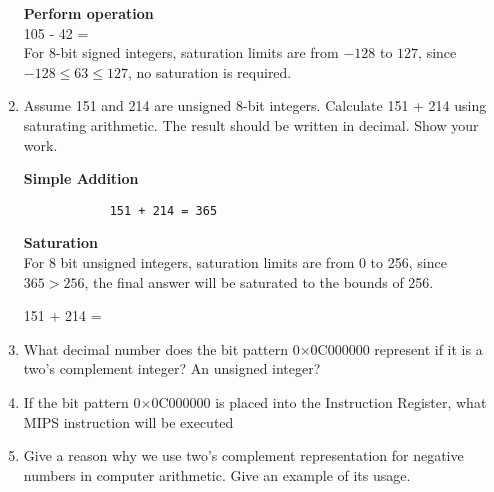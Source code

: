 \documentclass{article}
\begin{document}
\begin{enumerate}
        \textbf{Perform operation}\\[0.25in]
        105 - 42 = \\[0.25in]
        For 8-bit signed integers, saturation limits are from $-128$ to $127$, since $-128\leq63\leq127$, no saturation is required.

        \item Assume 151 and 214 are unsigned 8-bit integers. Calculate 151 + 214 using saturating arithmetic. The result should be written in decimal. Show your work.
        
        \textbf{Simple Addition}
        \begin{verbatim}
            151 + 214 = 365
        \end{verbatim}

        \textbf{Saturation}\\
        For 8 bit unsigned integers, saturation limits are from 0 to 256, since $365 > 256$, the final answer will be saturated to the bounds of 256.

        151 + 214 = 

        \item What decimal number does the bit pattern 0×0C000000 represent if it is a two's complement integer? An unsigned integer?
        
        \item If the bit pattern 0×0C000000 is placed into the Instruction Register, what MIPS instruction will be executed
        
        \item Give a reason why we use two’s complement representation for negative numbers in computer
        arithmetic. Give an example of its usage.
    \end{enumerate}
\end{document}
